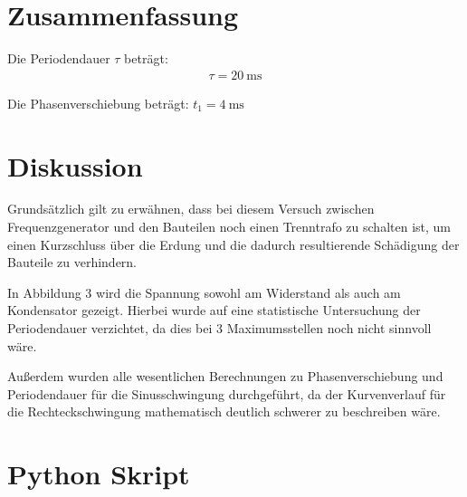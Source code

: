 \documentclass{article}
\begin{document}
\section{Zusammenfassung}

Die Periodendauer $\tau$ beträgt:
\begin{align*}
\tau = 20~\text{ms}
\end{align*}

Die Phasenverschiebung beträgt:
$t_1 = 4~\text{ms}$






\section{Diskussion}


Grundsätzlich gilt zu erwähnen, dass bei diesem Versuch zwischen Frequenzgenerator und den Bauteilen noch einen Trenntrafo zu schalten ist, um einen Kurzschluss über die Erdung und die dadurch resultierende Schädigung der Bauteile zu verhindern.

In Abbildung 3 wird die Spannung sowohl am Widerstand als auch am Kondensator gezeigt. Hierbei wurde auf eine statistische Untersuchung der Periodendauer verzichtet, da dies bei 3 Maximumsstellen noch nicht sinnvoll wäre.

Außerdem wurden alle wesentlichen Berechnungen zu Phasenverschiebung und Periodendauer für die Sinusschwingung durchgeführt, da der Kurvenverlauf für die Rechteckschwingung mathematisch deutlich schwerer zu beschreiben wäre.








\appendix
\section{Python Skript}



\end{document}
